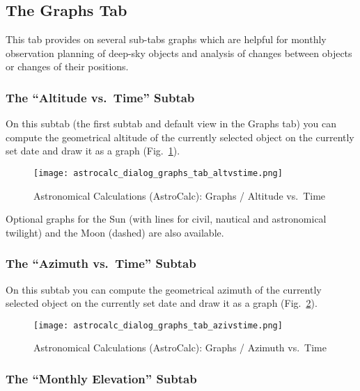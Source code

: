 \subsection{The Graphs Tab}
\label{sec:gui:AstroCalc:Graphs}

This tab provides on several sub-tabs
 graphs which are helpful for monthly observation
planning of deep-sky objects and analysis of changes between objects
or changes of their positions.

\subsubsection{The ``Altitude vs.\ Time'' Subtab}
\label{sec:gui:AstroCalc:Graphs:AltVsTime}
  
On this subtab (the first subtab and default view in the Graphs tab) you can compute the geometrical altitude of the currently selected object 
on the currently set date and draw it as a graph (Fig.~\ref{fig:gui:AstroCalc:Graphs:AltVsTime}).
    
\begin{figure}[htbp]
\centering\texttt{[image: astrocalc\_dialog\_graphs\_tab\_altvstime.png]}
\caption{Astronomical Calculations (AstroCalc): Graphs / Altitude vs.\ Time}
\label{fig:gui:AstroCalc:Graphs:AltVsTime}
\end{figure}

Optional graphs for the Sun (with lines for civil, nautical and astronomical twilight) and the Moon (dashed) are also available.

\newpage 
\subsubsection{The ``Azimuth vs.\ Time'' Subtab}
\label{sec:gui:AstroCalc:Graphs:AziVsTime}
  
On this subtab  you can compute the geometrical azimuth of the currently selected object 
on the currently set date and draw it as a graph (Fig.~\ref{fig:gui:AstroCalc:Graphs:AziVsTime}).
    
\begin{figure}[htbp]
\centering\texttt{[image: astrocalc\_dialog\_graphs\_tab\_azivstime.png]}
\caption{Astronomical Calculations (AstroCalc): Graphs / Azimuth vs.\ Time}
\label{fig:gui:AstroCalc:Graphs:AziVsTime}
\end{figure}

\subsubsection{The ``Monthly Elevation'' Subtab}
\label{sec:gui:AstroCalc:Graphs:ME}

